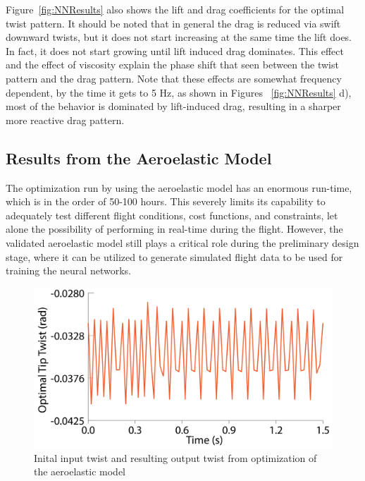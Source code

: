 \documentclass[11pt]{ucthesis}
\begin{document}
Figure~\ref{fig:NNResults} also shows the lift and drag coefficients for the optimal twist pattern. It should be noted that in general the drag is reduced via swift downward twists, but it does not start increasing at the same time the lift does. In fact, it does not start growing until lift induced drag dominates. This effect and the effect of viscosity explain the phase shift that seen between the twist pattern and the drag pattern. Note that these effects are somewhat frequency dependent, by the time it gets to 5 Hz, as shown in Figures ~\ref{fig:NNResults} d), most of the behavior is dominated by lift-induced drag, resulting in a sharper more reactive drag pattern.

\subsection{Results from the Aeroelastic Model}
 The optimization run by using the aeroelastic model has an enormous run-time, which is in the order of 50-100 hours. This severely limits its capability to adequately test different flight conditions, cost functions, and constraints, let alone the possibility of performing in real-time during the flight. However, the validated aeroelastic model still plays a critical role during the preliminary design stage, where it can be utilized to generate simulated flight data to be used for training the neural networks.   

\begin{figure}[thpb]
\centering
\includegraphics[width=0.9\linewidth]{./Figures/AeroOptimalTwist-01.png}
\caption{Inital input twist and resulting output twist from optimization of the aeroelastic model}
\label{fig:AeroTwist}
\end{figure}
\end{document}
